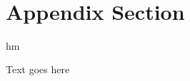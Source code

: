 \documentclass[12pt]{article}
\begin{document}



\printbibliography


\newpage~\appendix

\section{Appendix Section}

hm 

Text goes here
\end{document}
